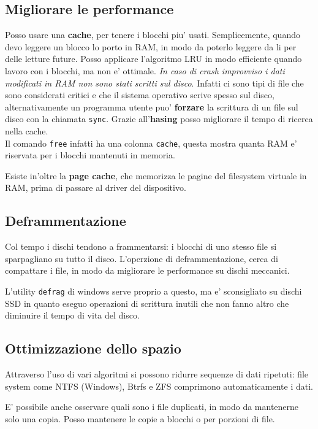 \subsection{Migliorare le performance}
Posso usare una \textbf{cache}, per tenere i blocchi piu' usati. Semplicemente, quando devo leggere un blocco
lo porto in RAM, in modo da poterlo leggere da li per delle letture future.
Posso applicare l'algoritmo LRU in modo efficiente quando lavoro con i blocchi, ma non e' ottimale. \textit{In caso di crash improvviso
i dati modificati in RAM non sono stati scritti sul disco}.
Infatti ci sono tipi di file che sono considerati critici e che il sistema operativo scrive spesso sul disco, alternativamente un programma
utente puo' \textbf{forzare} la scrittura di un file sul disco con la chiamata \texttt{sync}. Grazie all'\textbf{hasing} posso migliorare il tempo di
ricerca nella cache. \\

Il comando \texttt{free} infatti ha una colonna \texttt{cache}, questa mostra quanta RAM e' riservata per i blocchi
mantenuti in memoria.

Esiste in'oltre la \textbf{page cache}, che memorizza le pagine del filesystem virtuale in RAM, prima di 
passare al driver del dispositivo.

\subsection{Deframmentazione}
Col tempo i dischi tendono a frammentarsi: i blocchi di uno stesso file si sparpagliano su tutto il disco.
L'operzione di deframmentazione, cerca di compattare i file, in modo da migliorare le performance su dischi meccanici.

L'utility \texttt{defrag} di windows serve proprio a questo, ma e' sconsigliato su dischi SSD in quanto eseguo operazioni
di scrittura inutili che non fanno altro che diminuire il tempo di vita del disco.

\subsection{Ottimizzazione dello spazio}
Attraverso l'uso di vari algoritmi si possono ridurre sequenze di dati ripetuti: file system come NTFS (Windows), Btrfs e ZFS 
comprimono automaticamente i dati.

E' possibile anche osservare quali sono i file duplicati, in modo da mantenerne solo una copia. Posso mantenere 
le copie a blocchi o per porzioni di file.

